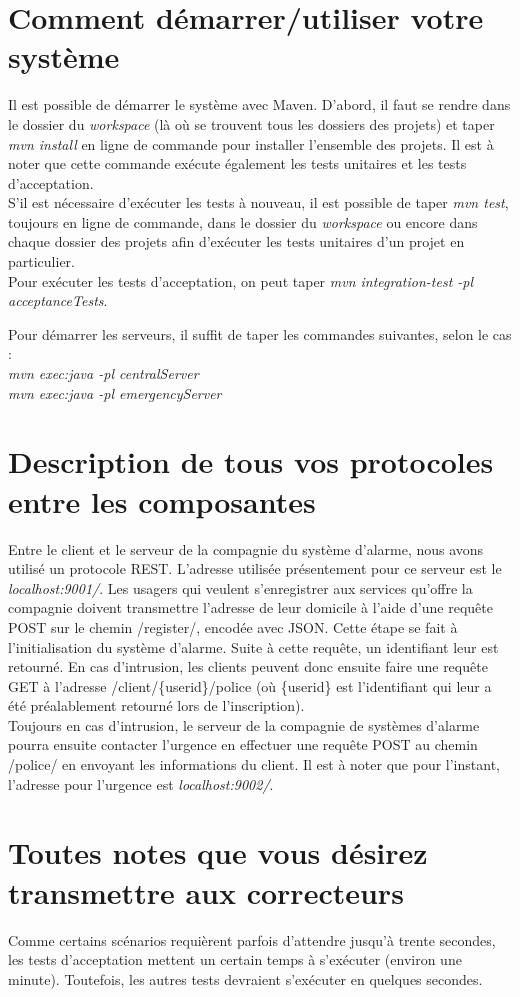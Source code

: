 \section*{Comment démarrer/utiliser votre système}
Il est possible de démarrer le système avec Maven. D'abord, il faut se rendre dans le dossier du \emph{workspace} (là où se trouvent tous les dossiers des projets) et taper \emph{mvn install} en ligne de commande pour installer l'ensemble des projets. Il est à noter que cette commande exécute également les tests unitaires et les tests d'acceptation.\\
S'il est nécessaire d'exécuter les tests à nouveau, il est possible de taper \emph{mvn test}, toujours en ligne de commande, dans le dossier du \emph{workspace} ou encore dans chaque dossier des projets afin d'exécuter les tests unitaires d'un projet en particulier.\\
Pour exécuter les tests d'acceptation, on peut taper \emph{mvn integration-test -pl acceptanceTests}.

Pour démarrer les serveurs, il suffit de taper les commandes suivantes, selon le cas :\\
\emph{mvn exec:java -pl centralServer}\\
\emph{mvn exec:java -pl emergencyServer}

\section*{Description de tous vos protocoles entre les composantes}
Entre le client et le serveur de la compagnie du système d'alarme, nous avons utilisé un protocole REST. L'adresse utilisée présentement pour ce serveur est le \emph{localhost:9001/}. Les usagers qui veulent s'enregistrer aux services qu'offre la compagnie doivent transmettre l'adresse de leur domicile à l'aide d'une requête POST sur le chemin /register/, encodée avec JSON. Cette étape se fait à l'initialisation du système d'alarme. Suite à cette requête, un identifiant leur est retourné. En cas d'intrusion, les clients peuvent donc ensuite faire une requête GET à l'adresse /client/\{userid\}/police (où \{userid\} est l'identifiant qui leur a été préalablement retourné lors de l'inscription). \\

Toujours en cas d'intrusion, le serveur de la compagnie de systèmes d'alarme pourra ensuite contacter l'urgence en effectuer une requête POST au chemin /police/ en envoyant les informations du client. Il est à noter que pour l'instant, l'adresse pour l'urgence est \emph{localhost:9002/}.

\section*{Toutes notes que vous désirez transmettre aux correcteurs}
Comme certains scénarios requièrent parfois d'attendre jusqu'à trente secondes, les tests d'acceptation mettent un certain temps à s'exécuter (environ une minute). Toutefois, les autres tests devraient s'exécuter en quelques secondes.
